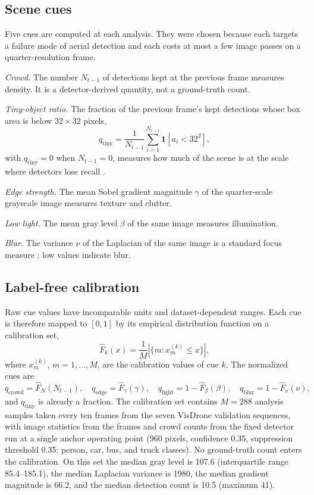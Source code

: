 \documentclass[journal]{new-aiaa}
\begin{document}
\subsection{Scene cues}
Five cues are computed at each analysis. They were chosen because each targets a failure mode of aerial detection and each costs at most a few image passes on a quarter-resolution frame.

\emph{Crowd.} The number $N_{t-1}$ of detections kept at the previous frame measures density. It is a detector-derived quantity, not a ground-truth count.

\emph{Tiny-object ratio.} The fraction of the previous frame's kept detections whose box area is below $32\times32$ pixels,
\begin{equation}
q_{\mathrm{tiny}} = \frac{1}{N_{t-1}} \sum_{i=1}^{N_{t-1}} \mathbf{1}\left[a_i < 32^2\right],
\label{eq:tiny}
\end{equation}
with $q_{\mathrm{tiny}}=0$ when $N_{t-1}=0$, measures how much of the scene is at the scale where detectors lose recall \cite{cheng2023smallobject}.

\emph{Edge strength.} The mean Sobel gradient magnitude $\gamma$ of the quarter-scale grayscale image measures texture and clutter.

\emph{Low light.} The mean gray level $\beta$ of the same image measures illumination.

\emph{Blur.} The variance $\nu$ of the Laplacian of the same image is a standard focus measure \cite{pechpacheco2000blur}; low values indicate blur.

\subsection{Label-free calibration}
Raw cue values have incomparable units and dataset-dependent ranges. Each cue is therefore mapped to $[0,1]$ by its empirical distribution function on a calibration set,
\begin{equation}
\hat F_k(x) = \frac{1}{M} \left|\{ m : x_m^{(k)} \le x \}\right|,
\label{eq:rank}
\end{equation}
where $x_m^{(k)}$, $m=1,\ldots,M$, are the calibration values of cue $k$. The normalized cues are
\begin{equation}
q_{\mathrm{crowd}}=\hat F_{N}(N_{t-1}),\quad q_{\mathrm{edge}}=\hat F_{\gamma}(\gamma),\quad q_{\mathrm{light}}=1-\hat F_{\beta}(\beta),\quad q_{\mathrm{blur}}=1-\hat F_{\nu}(\nu),
\label{eq:cues}
\end{equation}
and $q_{\mathrm{tiny}}$ is already a fraction. The calibration set contains $M=288$ analysis samples taken every ten frames from the seven VisDrone validation sequences, with image statistics from the frames and crowd counts from the fixed detector run at a single anchor operating point (960 pixels, confidence 0.35, suppression threshold 0.35; person, car, bus, and truck classes). No ground-truth count enters the calibration. On this set the median gray level is 107.6 (interquartile range 85.4--185.1), the median Laplacian variance is 1980, the median gradient magnitude is 66.2, and the median detection count is 10.5 (maximum 41).
\end{document}
